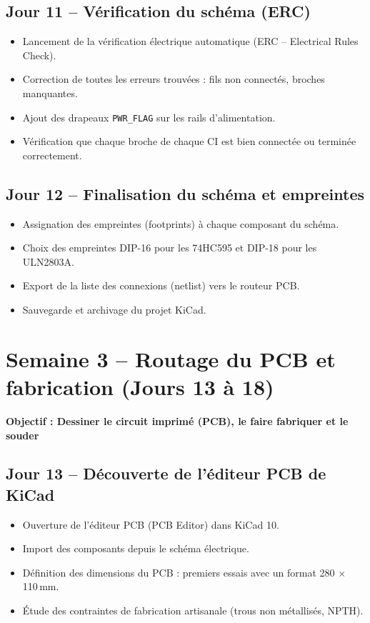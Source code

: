 \documentclass[12pt,a4paper]{article}
\begin{document}
\subsection*{Jour 11 -- Vérification du schéma (ERC)}
\begin{itemize}
    \item Lancement de la vérification électrique automatique (ERC -- Electrical Rules Check).
    \item Correction de toutes les erreurs trouvées : fils non connectés, broches manquantes.
    \item Ajout des drapeaux \texttt{PWR\_FLAG} sur les rails d'alimentation.
    \item Vérification que chaque broche de chaque CI est bien connectée ou terminée correctement.
\end{itemize}

\subsection*{Jour 12 -- Finalisation du schéma et empreintes}
\begin{itemize}
    \item Assignation des empreintes (footprints) à chaque composant du schéma.
    \item Choix des empreintes DIP-16 pour les 74HC595 et DIP-18 pour les ULN2803A.
    \item Export de la liste des connexions (netlist) vers le routeur PCB.
    \item Sauvegarde et archivage du projet KiCad.
\end{itemize}

\newpage

\section{Semaine 3 -- Routage du PCB et fabrication (Jours 13 à 18)}

\colorbox{semaine3}{\parbox{\linewidth}{\centering\textbf{Objectif : Dessiner le circuit imprimé (PCB), le faire fabriquer et le souder}}}

\bigskip

\subsection*{Jour 13 -- Découverte de l'éditeur PCB de KiCad}
\begin{itemize}
    \item Ouverture de l'éditeur PCB (PCB Editor) dans KiCad 10.
    \item Import des composants depuis le schéma électrique.
    \item Définition des dimensions du PCB : premiers essais avec un format 280 × 110\,mm.
    \item Étude des contraintes de fabrication artisanale (trous non métallisés, NPTH).
\end{itemize}
\end{document}
